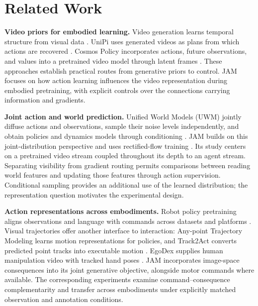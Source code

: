 \section{Related Work}
\textbf{Video priors for embodied learning.}
Video generation learns temporal structure from visual data \citep{wan}. UniPi uses generated videos
as plans from which actions are recovered \citep{unipi}. Cosmos Policy incorporates actions, future
observations, and values into a pretrained video model through latent frames \citep{cosmos}. These
approaches establish practical routes from generative priors to control. JAM focuses on how action
learning influences the video representation during embodied pretraining, with explicit controls
over the connections carrying information and gradients.

\textbf{Joint action and world prediction.}
Unified World Models (UWM) jointly diffuse actions and observations, sample their noise levels
independently, and obtain policies and dynamics models through conditioning \citep{uwm}. JAM builds
on this joint-distribution perspective and uses rectified-flow training
\citep{flowmatching,rectifiedflow}. Its study centers on a pretrained video stream coupled
throughout its depth to an agent stream. Separating visibility from gradient routing permits
comparisons between reading world features and updating those features through action supervision.
Conditional sampling provides an additional use of the learned distribution; the representation
question motivates the experimental design.

\textbf{Action representations across embodiments.}
Robot policy pretraining aligns observations and language with commands across datasets and
platforms \citep{openvla,droid,bridge}. Visual trajectories offer another interface to interaction:
Any-point Trajectory Modeling learns motion representations for policies, and Track2Act converts
predicted point tracks into executable motion \citep{atm,track2act}. EgoDex supplies human
manipulation video with tracked hand poses \citep{egodex}. JAM incorporates image-space consequences
into its joint generative objective, alongside motor commands where available. The corresponding
experiments examine command--consequence complementarity and transfer across embodiments under
explicitly matched observation and annotation conditions.
